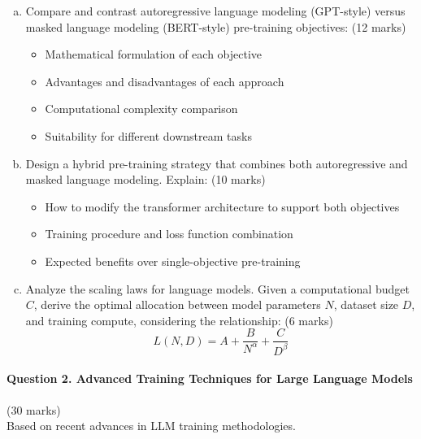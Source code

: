 \documentclass[12pt]{article}
\newcommand{\mediumanswer}{\vspace{3cm}}
\newcommand{\journalspace}{\vspace{4.5cm}}
\begin{document}
\begin{enumerate}[(a)]
    \item Compare and contrast autoregressive language modeling (GPT-style) versus masked language modeling (BERT-style) pre-training objectives: \hfill (12 marks)
    \begin{itemize}
        \item Mathematical formulation of each objective
        \item Advantages and disadvantages of each approach
        \item Computational complexity comparison
        \item Suitability for different downstream tasks
    \end{itemize}
    
    \journalspace
    
    \item Design a hybrid pre-training strategy that combines both autoregressive and masked language modeling. Explain: \hfill (10 marks)
    \begin{itemize}
        \item How to modify the transformer architecture to support both objectives
        \item Training procedure and loss function combination
        \item Expected benefits over single-objective pre-training
    \end{itemize}
    
    \mediumanswer
    
    \item Analyze the scaling laws for language models. Given a computational budget $C$, derive the optimal allocation between model parameters $N$, dataset size $D$, and training compute, considering the relationship: \hfill (6 marks)
    $$L(N, D) = A + \frac{B}{N^{\alpha}} + \frac{C}{D^{\beta}}$$
    
    \mediumanswer
\end{enumerate}

\newpage
\paragraph{Question 2. Advanced Training Techniques for Large Language Models}\hfill (30 marks)\\
Based on recent advances in LLM training methodologies.
\end{document}
